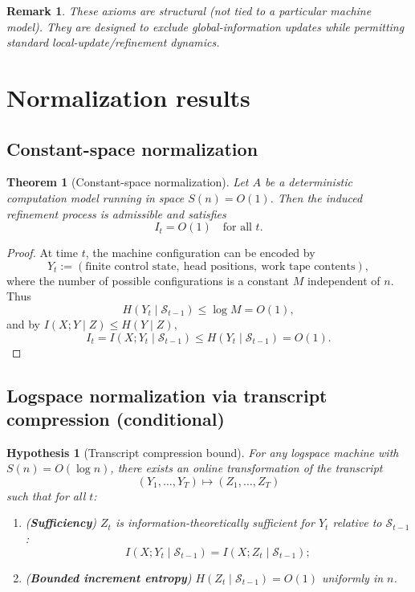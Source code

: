 \documentclass[11pt]{article}
\newtheorem{theorem}{Theorem}
\newtheorem{hypothesis}{Hypothesis}
\newtheorem{remark}{Remark}
\begin{document}
\begin{remark}
These axioms are structural (not tied to a particular machine model). They are designed to exclude global-information
updates while permitting standard local-update/refinement dynamics.
\end{remark}

\section{Normalization results}

\subsection{Constant-space normalization}

\begin{theorem}[Constant-space normalization]\label{thm:csn}
Let $A$ be a deterministic computation model running in space $S(n)=O(1)$.
Then the induced refinement process is admissible and satisfies
\[
I_t = O(1)\quad\text{for all }t.
\]
\end{theorem}

\begin{proof}
At time $t$, the machine configuration can be encoded by
\[
Y_t := (\text{finite control state},\ \text{head positions},\ \text{work tape contents}),
\]
where the number of possible configurations is a constant $M$ independent of $n$.
Thus
\[
H(Y_t \mid \mathcal S_{t-1}) \le \log M = O(1),
\]
and by $I(X;Y\mid Z)\le H(Y\mid Z)$,
\[
I_t = I(X;Y_t \mid \mathcal S_{t-1}) \le H(Y_t \mid \mathcal S_{t-1}) = O(1).
\]
\end{proof}

\subsection{Logspace normalization via transcript compression (conditional)}

\begin{hypothesis}[Transcript compression bound]\label{hyp:compress}
For any logspace machine with $S(n)=O(\log n)$, there exists an online transformation of the transcript
\[
(Y_1,\dots,Y_T)\mapsto (Z_1,\dots,Z_T)
\]
such that for all $t$:
\begin{enumerate}
\item (\textbf{Sufficiency}) $Z_t$ is information-theoretically sufficient for $Y_t$ relative to $\mathcal S_{t-1}$:
\[
I(X;Y_t \mid \mathcal S_{t-1}) = I(X;Z_t \mid \mathcal S_{t-1});
\]
\item (\textbf{Bounded increment entropy}) $H(Z_t \mid \mathcal S_{t-1}) = O(1)$ uniformly in $n$.
\end{enumerate}
\end{hypothesis}
\end{document}
